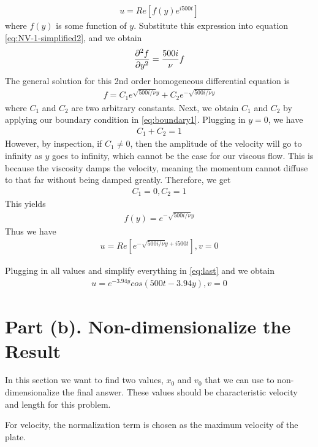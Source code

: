 \documentclass{article}
\begin{document}
\begin{align}
u = Re[f(y)e^{i500t}] \label{eq:v=0}
\end{align}
where $f(y)$ is some function of $y$. Substitute this expression into equation \ref{eq:NV-1-simplified2}, and we obtain
\begin{align}
\pdv[2]{f}{y} = \frac{500i}{\nu}f \label{eq:fyeq}
\end{align}
The general solution for this 2nd order homogeneous differential equation is 
\begin{align}
f = C_1 e^{\sqrt{500i/\nu}y} + C_2 e^{-\sqrt{500i/\nu}y}\label{eq:generalSoln}
\end{align} where $C_1$ and $C_2$ are two arbitrary constants. Next, we obtain $C_1$ and $C_2$ by applying our boundary condition in \ref{eq:boundary1}. Plugging in $y = 0$, we have
\begin{align}
C_1 + C_2 = 1
\end{align}
 However, by inspection, if $C_1 \neq 0$, then the amplitude of the velocity will go to infinity as $y$ goes to infinity, which cannot be the case for our viscous flow. This is because the viscosity damps the velocity, meaning the momentum cannot diffuse to that far without being damped greatly. Therefore, we get
\begin{align}
C_1 = 0, C_2 = 1
\end{align}
This yields
\begin{align}
f(y) = e^{-\sqrt{500i/\nu}y} \label{eq:fy}
\end{align}
Thus we have
\begin{align}
u = Re[e^{-\sqrt{500i/\nu}y + i500t}], v = 0 \label{eq:last}
\end{align}

Plugging in all values and simplify everything in \ref{eq:last} and we obtain
\begin{align}
u = e^{-3.94y}cos(500t - 3.94y), v = 0 \label{eq:wave}
\end{align}

\section{Part (b). Non-dimensionalize the Result}
In this section we want to find two values, $x_0$ and $v_0$ that we can use to non-dimensionalize the final answer. These values should be characteristic velocity and length for this problem.

For velocity, the normalization term is chosen as the maximum velocity of the plate.
\end{document}
